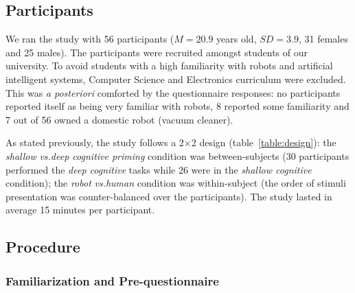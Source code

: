 \documentclass[lettersize, noapacite, twoside, HRI]{apa_HRI}
\newcommand{\vs}{\textit{vs.}\xspace}
\begin{document}
%
%
%
%

\subsection{Participants}

We ran the study with 56 participants ($M = 20.9$ years old, $SD = 3.9$, 31 females and
25 males).  The participants were recruited amongst students of our university.
To avoid students with a high familiarity with robots and artificial intelligent
systems, Computer Science and Electronics curriculum were excluded. This was
\textit{a posteriori} comforted by the questionnaire responses: no participants
reported itself as being very familiar with robots, 8 reported some familiarity
and 7 out of 56 owned a domestic robot (vacuum cleaner).

As stated previously, the study follows a 2$\times$2 design
(table~\ref{table:design}): the \emph{shallow} \vs \emph{deep cognitive priming}
condition was between-subjects (30 participants performed the \emph{deep cognitive}
tasks while 26 were in the \emph{shallow cognitive} condition); the \emph{robot}
\vs \emph{human} condition was within-subject (the order of stimuli presentation
was counter-balanced over the participants). The study lasted in average 15
minutes per participant.

\subsection{Procedure}

\subsubsection{Familiarization and Pre-questionnaire}
\end{document}
